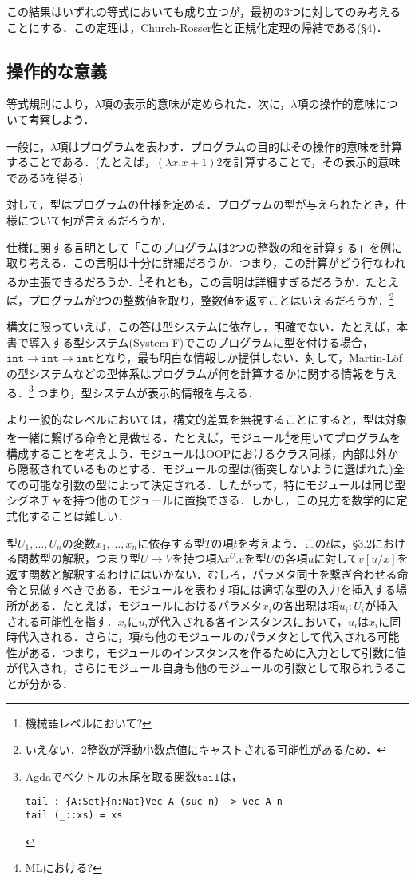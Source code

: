 \documentclass[a4paper,10pt,platex, dvipdfmx]{jsarticle}
\begin{document}
この結果はいずれの等式においても成り立つが，最初の3つに対してのみ考えることにする．この定理は，Church-Rosser性と正規化定理の帰結である(\S4)．
\subsection{操作的な意義}
等式規則により，$\lambda$項の表示的意味が定められた．次に，$\lambda$項の操作的意味について考察しよう．

一般に，$\lambda$項はプログラムを表わす．プログラムの目的はその操作的意味を計算することである．(たとえば，$(\lambda x. x + 1) 2$を計算することで，その表示的意味である5を得る)

対して，型はプログラムの仕様を定める．プログラムの型が与えられたとき，仕様について何が言えるだろうか．

仕様に関する言明として「このプログラムは2つの整数の和を計算する」を例に取り考える．この言明は十分に詳細だろうか．つまり，この計算がどう行なわれるか主張できるだろうか．\footnote{機械語レベルにおいて?}それとも，この言明は詳細すぎるだろうか．たとえば，プログラムが2つの整数値を取り，整数値を返すことはいえるだろうか．\footnote{いえない．2整数が浮動小数点値にキャストされる可能性があるため．}

構文に限っていえば，この答は型システムに依存し，明確でない．たとえば，本書で導入する型システム(System F)でこのプログラムに型を付ける場合，$\mathtt{int\rightarrow int \rightarrow int}$となり，最も明白な情報しか提供しない．対して，Martin-L\"ofの型システムなどの型体系はプログラムが何を計算するかに関する情報を与える．\footnote{Agdaでベクトルの末尾を取る関数$\mathtt{tail}$は，\begin{lstlisting}
tail : {A:Set}{n:Nat}Vec A (suc n) -> Vec A n
tail (_::xs) = xs
\end{lstlisting}}
つまり，型システムが表示的情報を与える．

より一般的なレベルにおいては，構文的差異を無視することにすると，型は対象を一緒に繋げる命令と見做せる．たとえば，モジュール\footnote{MLにおける?}を用いてプログラムを構成することを考えよう．モジュールはOOPにおけるクラス同様，内部は外から隠蔽されているものとする．モジュールの型は(衝突しないように選ばれた)全ての可能な引数の型によって決定される．したがって，特にモジュールは同じ型シグネチャを持つ他のモジュールに置換できる．しかし，この見方を数学的に定式化することは難しい．

型$U_{1},\ldots,U_{n}$の変数$x_{1},\ldots, x_{n}$に依存する型$T$の項$t$を考えよう．この$t$は，\S3.2における関数型の解釈，つまり型$U\rightarrow V$を持つ項$\lambda x^{U}. v$を型$U$の各項$u$に対して$v\left[u/x\right]$を返す関数と解釈するわけにはいかない．むしろ，パラメタ同士を繋ぎ合わせる命令と見做すべきである．モジュールを表わす項には適切な型の入力を挿入する場所がある．たとえば，モジュールにおけるパラメタ$x_{i}$の各出現は項$u_{i}:U_{i}$が挿入される可能性を指す．$x_{i}$に$u_{i}$が代入される各インスタンスにおいて，$u_{i}$は$x_{i}$に同時代入される．さらに，項$t$も他のモジュールのパラメタとして代入される可能性がある．つまり，モジュールのインスタンスを作るために入力として引数に値が代入され，さらにモジュール自身も他のモジュールの引数として取られうることが分かる．
\end{document}
